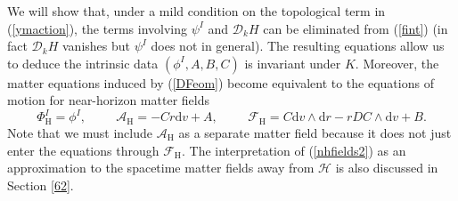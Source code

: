 \documentclass[11pt, reqno]{amsart}
\theoremstyle{plain}
\theoremstyle{definition}
\numberwithin{equation}{section}
\begin{document}
We will show that, under a mild condition on the topological term in (\ref{ymaction}), the terms involving $\psi^I$ and $\mathcal{D}_kH$ can be eliminated from (\ref{fint}) (in fact $\mathcal{D}_kH$ vanishes but $\psi^I$ does not in general). The resulting equations allow us to deduce the intrinsic data $(\phi^I,A,B,C)$ is invariant under $K$. Moreover, the matter equations induced by (\ref{DFeom}) become equivalent to the equations of motion for near-horizon matter fields
\begin{equation} \label{nhfields2}
    \Phi^I_{\text{H}} = \phi^I, \hspace{1cm} \mathcal{A}_{\text{H}} = -C r\text{d}v + A, \hspace{1cm} \mathcal{F}_{\text{H}} = C \text{d}v\wedge\text{d}r - rDC\wedge\text{d}v + B.
\end{equation}
Note that we must include  $\mathcal{A}_{\text{H}}$ as a separate matter field because it does not just enter the equations through $\mathcal{F}_{\text{H}}$. The interpretation of (\ref{nhfields2}) as an approximation to the spacetime matter fields away from $\mathcal{H}$ is also discussed in Section \ref{62}.
\end{document}

